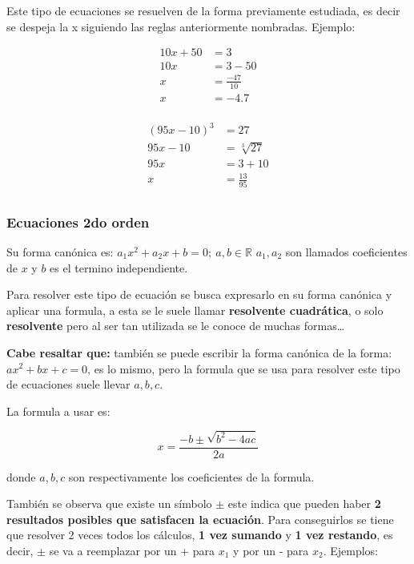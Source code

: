     Este tipo de ecuaciones se resuelven de la forma previamente estudiada, es
    decir se despeja la x siguiendo las reglas anteriormente nombradas. Ejemplo:

    \begin{align*}
        10x +50 &= 3		\\
        10x &= 3-50 \\
        x &= \frac{-47}{10} \\
        x &= -4.7\\
    \end{align*}

   \begin{align*}
       (95x -10)^3 &= 27		\\
       95x -10 &= \sqrt[3]{27} \\
       95x &= 3 +10\\
       x &= \frac{13}{95} \\
   \end{align*}



    \subsubsection*{Ecuaciones 2do orden} \label{Ecuaciones-2do-orden}
    Su forma canónica es: $a_1x^2+a_2x+b=0;\ a,b\in\mathbb{R}$ $a_1,a_2$ son
    llamados coeficientes  de $x$ y $b$ es el termino independiente.

    Para resolver este tipo de ecuación se busca expresarlo en su forma canónica
    y aplicar una formula, a esta se le suele llamar \textbf{resolvente cuadrática},
    o solo \textbf{resolvente} pero al ser tan utilizada se le conoce de muchas
    formas\dots

    \textbf{Cabe resaltar que:}
    también se puede escribir la forma canónica de la forma:
    $ax^2+bx+c=0$, es lo mismo, pero la formula que se usa para resolver este tipo
    de ecuaciones suele llevar $a,b,c$.

    La formula a usar es:

    $$x = \frac{-b \pm \sqrt{b^2 - 4ac}}{2a} $$


    donde $a,b,c$ son respectivamente los coeficientes de la formula.

    También se observa que existe un símbolo $\pm$ este indica que pueden haber
    \textbf{2 resultados posibles que satisfacen la ecuación}. Para conseguirlos
    se tiene que resolver 2 veces todos los cálculos, \textbf{1 vez sumando} y
    \textbf{1 vez restando}, es decir, $\pm$ se va a reemplazar por un + para
    $x_1$ y por un - para $x_2$.    Ejemplos:



